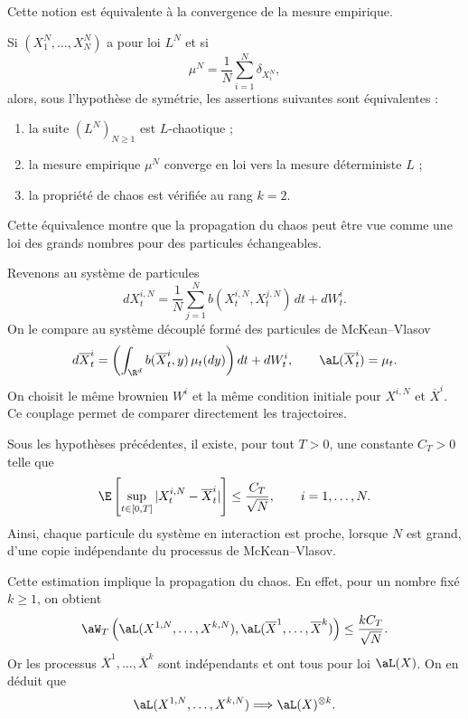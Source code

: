 Cette notion est équivalente à la convergence de la mesure empirique.

\begin{thm}{}{}
	Si $(X_1^N,\dots,X_N^N)$ a pour loi $L^N$ et si
	\[
		\mu^N
		=
		\frac1N
		\sum_{i=1}^{N}
		\delta_{X_i^N},
	\]
	alors, sous l'hypothèse de symétrie, les assertions suivantes sont équivalentes :
	\begin{enumerate}
		\item la suite $(L^N)_{N\geq1}$ est $L$-chaotique ;
		\item la mesure empirique $\mu^N$ converge en loi vers la mesure déterministe $L$ ;
		\item la propriété de chaos est vérifiée au rang $k=2$.
	\end{enumerate}
\end{thm}

Cette équivalence montre que la propagation du chaos peut être vue comme une loi des
grands nombres pour des particules échangeables.

Revenons au système de particules
\[
	dX_t^{i,N}
	=
	\frac1N
	\sum_{j=1}^{N}
	b(X_t^{i,N},X_t^{j,N})\,dt
	+
	dW_t^i.
\]
On le compare au système découplé formé des particules de McKean--Vlasov
\[
	d\overline X_t^i
	=
	\left(
	\int_{\R^d}
	b(\overline X_t^i,y)\,\mu_t(dy)
	\right)dt
	+
	dW_t^i,
	\qquad
	\aL(\overline X_t^i)=\mu_t.
\]
On choisit le même brownien $W^i$ et la même condition initiale pour $X^{i,N}$ et
$\overline X^i$. Ce couplage permet de comparer directement les trajectoires.

Sous les hypothèses précédentes, il existe, pour tout $T>0$, une constante $C_T>0$ telle
que
\[
	\E\left[
	\sup_{t\in[0,T]}
	|X_t^{i,N}-\overline X_t^i|
	\right]
	\leq
	\frac{C_T}{\sqrt N},
	\qquad
	i=1,\dots,N.
\]
Ainsi, chaque particule du système en interaction est proche, lorsque $N$ est grand, d'une
copie indépendante du processus de McKean--Vlasov.

Cette estimation implique la propagation du chaos. En effet, pour un nombre fixé
$k\geq1$, on obtient
\[
	\aW_T
	\left(
	\aL(X^{1,N},\dots,X^{k,N}),
	\aL(\overline X^1,\dots,\overline X^k)
	\right)
	\leq
	\frac{kC_T}{\sqrt N}.
\]
Or les processus $\overline X^1,\dots,\overline X^k$ sont indépendants et ont tous pour loi
$\aL(X)$. On en déduit que
\[
	\aL(X^{1,N},\dots,X^{k,N})
	\Longrightarrow
	\aL(X)^{\otimes k}.
\]

